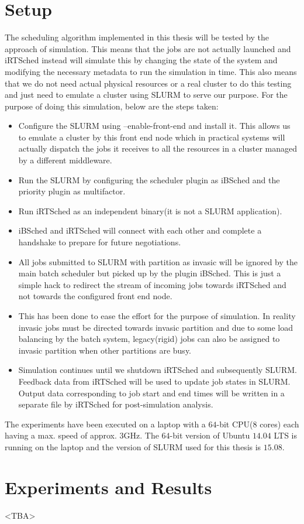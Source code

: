 \section{Setup}
The scheduling algorithm implemented in this thesis will be tested by the approach of simulation. This means that the jobs are not actually launched and iRTSched instead will simulate this by changing the state of the system and modifying the necessary metadata to run the simulation in time. This also means that we do not need actual physical resources or a real cluster to do this testing and just need to emulate a cluster using SLURM to serve our purpose. For the purpose of doing this simulation, below are the steps taken:
\begin{itemize}
\item Configure the SLURM using --enable-front-end and install it. This allows us to emulate a cluster by this front end node which in practical systems will actually dispatch the jobs it receives to all the resources in a cluster managed by a different middleware.
\item Run the SLURM by configuring the scheduler plugin as iBSched and the priority plugin as multifactor.
\item Run iRTSched as an independent binary(it is not a SLURM application).
\item iBSched and iRTSched will connect with each other and complete a handshake to prepare for future negotiations.
\item All jobs submitted to SLURM with partition as invasic will be ignored by the main batch scheduler but picked up by the plugin iBSched. This is just a simple hack to redirect the stream of incoming jobs towards iRTSched and not towards the configured front end node. 
\item This has been done to ease the effort for the purpose of simulation. In reality invasic jobs must be directed towards invasic partition and due to some load balancing by the batch system, legacy(rigid) jobs can also be assigned to invasic partition when other partitions are busy. 
\item Simulation continues until we shutdown iRTSched and subsequently SLURM. Feedback data from iRTSched will be used to update job states in SLURM. Output data corresponding to job start and end times will be written in a separate file by iRTSched for post-simulation analysis.
\end{itemize}
The experiments have been executed on a laptop with a $64$-bit CPU($8$ cores) each having a max. speed of approx. $3$GHz. The $64$-bit version of Ubuntu $14.04$ LTS is running on the laptop and the version of SLURM used for this thesis is $15.08$.
\section{Experiments and Results}
<TBA>
